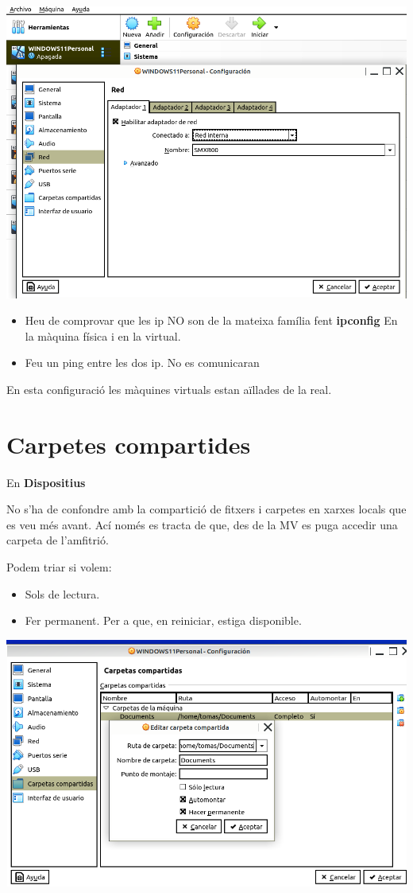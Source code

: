 \documentclass[
  12 pt,
  a4paper,
]{article}
\providecommand{\tightlist}{%
  \setlength{\itemsep}{0pt}\setlength{\parskip}{0pt}}
\begin{document}
\includegraphics{png/xarxainterna.png}

\begin{itemize}
\tightlist
\item
  Heu de comprovar que les ip NO son de la mateixa família fent
  \textbf{ipconfig} En la màquina física i en la virtual.
\item
  Feu un ping entre les dos ip. No es comunicaran
\end{itemize}

En esta configuració les màquines virtuals estan aïllades de la real.

\section{Carpetes compartides}\label{carpetes-compartides}

En \textbf{Dispositius}

No s'ha de confondre amb la compartició de fitxers i carpetes en xarxes
locals que es veu més avant. Ací només es tracta de que, des de la MV es
puga accedir una carpeta de l'amfitrió.

Podem triar si volem:

\begin{itemize}
\item
  Sols de lectura.
\item
  Fer permanent. Per a que, en reiniciar, estiga disponible.
\end{itemize}

\includegraphics{png/carpetacompartida.png}
\end{document}
